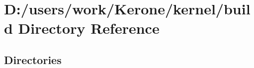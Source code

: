 \section{D\+:/users/work/\+Kerone/kernel/build Directory Reference}
\label{dir_cbb5bec7fe155e2a46d3c728b6b0f2c4}
\subsection*{Directories}
\begin{DoxyCompactItemize}
\end{DoxyCompactItemize}
